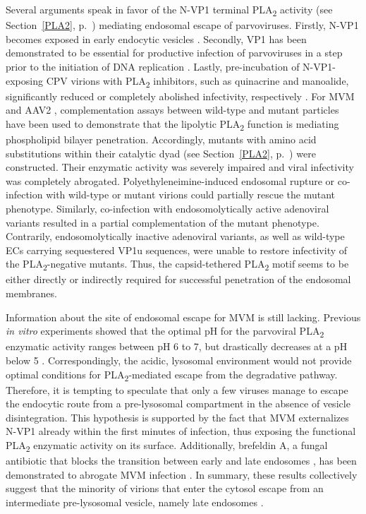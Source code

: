 Several arguments speak in favor of the N-VP1 terminal PLA\textsubscript{2} activity (see Section~\ref{PLA2}, p.~\pageref{PLA2}) mediating endosomal escape of parvoviruses. Firstly, N-VP1 becomes exposed in early endocytic vesicles \cite{pmid16379002, pmid14644609, pmid9927584, pmid16284249, pmid11961250, pmid20974479, pmid11702787}. Secondly, VP1 has been demonstrated to be essential for productive infection of parvoviruses in a step prior to the initiation of DNA replication \cite{pmid8416366, pmid10684294, pmid1733094, pmid11160681, pmid11287557, pmid10644365, pmid12438589, pmid9420290}. Lastly, pre-incubation of N-VP1-exposing CPV virions with PLA\textsubscript{2} inhibitors, such as quinacrine and manoalide, significantly reduced or completely abolished infectivity, respectively \cite{pmid14644609}. For MVM \cite{pmid16284249} and AAV2 \cite{pmid20974479}, complementation assays between wild-type and mutant particles have been used to demonstrate that the lipolytic PLA\textsubscript{2} function is mediating phospholipid bilayer penetration. Accordingly, mutants with amino acid substitutions within their catalytic dyad (see Section~\ref{PLA2}, p.~\pageref{PLA2}) were constructed. Their enzymatic activity was severely impaired and viral infectivity was completely abrogated. Polyethyleneimine-induced endosomal rupture or co-infection with wild-type or mutant virions could partially rescue the mutant phenotype. Similarly, co-infection with endosomolytically active adenoviral variants resulted in a partial complementation of the mutant phenotype. Contrarily, endosomolytically inactive adenoviral variants, as well as wild-type ECs carrying sequestered VP1u sequences, were unable to restore infectivity of the PLA\textsubscript{2}-negative mutants. Thus, the capsid-tethered PLA\textsubscript{2} motif seems to be either directly or indirectly required for successful penetration of the endosomal membranes.  

Information about the site of endosomal escape for MVM is still lacking. Previous \textit{in vitro} experiments showed that the optimal pH for the parvoviral PLA\textsubscript{2} enzymatic activity ranges between pH 6 to 7, but drastically decreases at a pH below 5 \cite{pmid14726513}. Correspondingly, the acidic, lysosomal environment would not provide optimal conditions for PLA\textsubscript{2}-mediated escape from the degradative pathway. Therefore, it is tempting to speculate that only a few viruses manage to escape the endocytic route from a pre-lysosomal compartment in the absence of vesicle disintegration. This hypothesis is supported by the fact that MVM externalizes N-VP1 already within the first minutes of infection, thus exposing the functional PLA\textsubscript{2} enzymatic activity on its surface. Additionally, brefeldin A, a fungal antibiotic that blocks the transition between early and late endosomes \cite{pmid1682055}, has been demonstrated to abrogate MVM infection \cite{pmid12438589}. In summary, these results collectively suggest that the minority of virions that enter the cytosol escape from an intermediate pre-lysosomal vesicle, namely late endosomes \cite{pmid16379002}.

